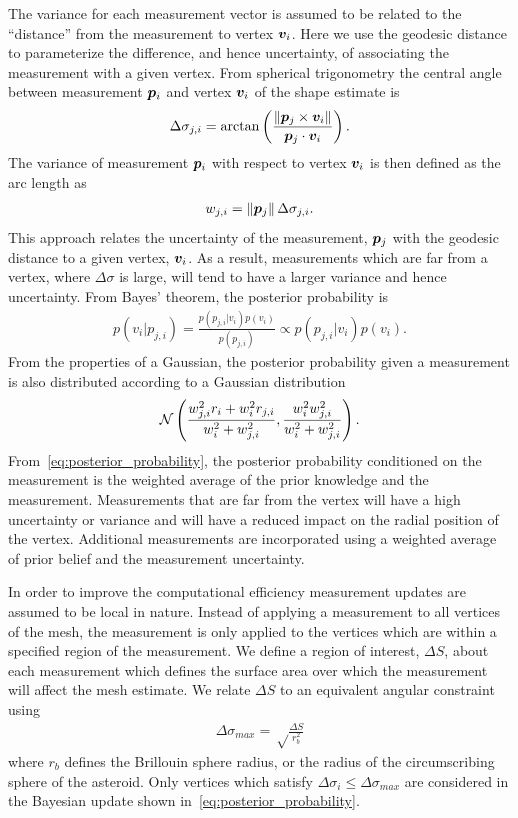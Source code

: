 \documentclass[letterpaper, paper,11pt]{AAS}		%
\begin{document}
The variance for each measurement vector is assumed to be related to the ``distance'' from the measurement to vertex \( \bm{v}_i \).
Here we use the geodesic distance to parameterize the difference, and hence  uncertainty, of associating the measurement with a given vertex.
From spherical trigonometry the central angle between measurement \( \bm{p}_i \) and vertex \( \bm{v}_i \) of the shape estimate is
\begin{align}
    \Delta \sigma_{j,i} = \arctan \left( \frac{\left\| \bm{p}_j \times \bm{v}_i \right\|}{\bm{p}_j \cdot \bm{v}_i } \right).
\end{align}
The variance of measurement \( \bm{p}_i \) with respect to vertex \( \bm{v}_i \) is then defined as the arc length as
\begin{align}
    w_{j, i} = \left\| \bm{p}_j \right\| \Delta \sigma_{j,i} .
\end{align}
This approach relates the uncertainty of the measurement, \( \bm{p}_j \) with the geodesic distance to a given vertex, \( \bm{v}_i \).
As a result, measurements which are far from a vertex, where \( \Delta \sigma \) is large, will tend to have a larger variance and hence uncertainty. 
From Bayes' theorem, the posterior probability is
\begin{align}
    p(v_i | p_{j, i}) = \frac{p(p_{j, i} | v_i) p(v_i)}{p( p_{j, i})} \propto p(p_{j,i} | v_i) p(v_i).
\end{align}
From the properties of a Gaussian, the posterior probability given a measurement is also distributed according to a Gaussian distribution
\begin{align}\label{eq:posterior_probability}
    \mathcal{N} \left( \frac{w_{j, i}^2 r_i + w_i^2 r_{j, i}}{w_i^2 + w_{j, i}^2} , \frac{w_i^2  w_{j, i}^2}{w_i^2 +  w_{j, i}^2} \right) .
\end{align}
From~\cref{eq:posterior_probability}, the posterior probability conditioned on the measurement is the weighted average of the prior knowledge and the measurement. 
Measurements that are far from the vertex will have a high uncertainty or variance and will have a reduced impact on the radial position of the vertex.
Additional measurements are incorporated using a weighted average of prior belief and the measurement uncertainty.

In order to improve the computational efficiency measurement updates are assumed to be local in nature.
Instead of applying a measurement to all vertices of the mesh, the measurement is only applied to the vertices which are within a specified region of the measurement. 
We define a region of interest, \( \Delta S \), about each measurement which defines the surface area over which the measurement will affect the mesh estimate.
We relate \( \Delta S \) to an equivalent angular constraint using
\begin{align}
    \Delta \sigma_{max} = \sqrt \frac{\Delta S}{r_b^2}
\end{align}
where \( r_b \) defines the Brillouin  sphere radius, or the radius of the circumscribing sphere of the asteroid.
Only vertices which satisfy \( \Delta \sigma_i \leq \Delta \sigma_{max} \) are considered in the Bayesian update shown in~\cref{eq:posterior_probability}.
\end{document}
